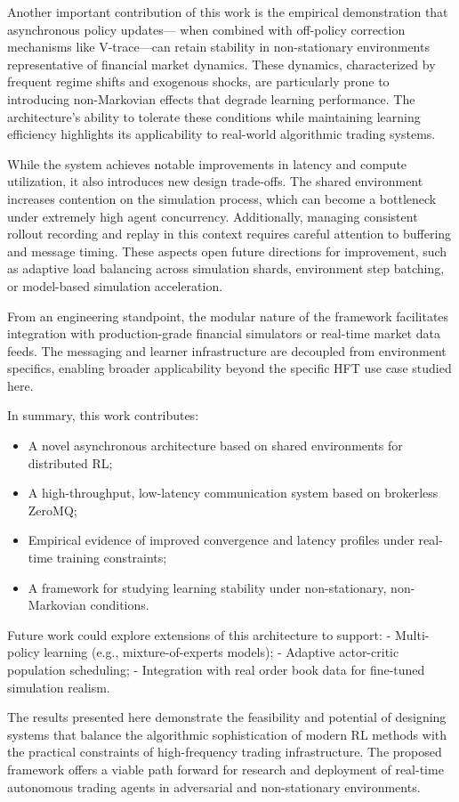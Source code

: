 Another important contribution of this work is the empirical demonstration that asynchronous policy updates---
when combined with off-policy correction mechanisms like V-trace---can retain stability in non-stationary environments representative of financial market dynamics.
These dynamics, characterized by frequent regime shifts and exogenous shocks, are particularly prone to introducing non-Markovian effects that degrade learning performance.
The architecture’s ability to tolerate these conditions while maintaining learning efficiency highlights its applicability to real-world algorithmic trading systems.


While the system achieves notable improvements in latency and compute utilization, it also introduces new design trade-offs.
The shared environment increases contention on the simulation process, which can become a bottleneck under extremely high agent concurrency.
Additionally, managing consistent rollout recording and replay in this context requires careful attention to buffering and message timing.
These aspects open future directions for improvement, such as adaptive load balancing across simulation shards, environment step batching,
or model-based simulation acceleration.

From an engineering standpoint, the modular nature of the framework facilitates integration with production-grade financial simulators or real-time market data feeds.
The messaging and learner infrastructure are decoupled from environment specifics, enabling broader applicability beyond the specific HFT use case studied here.

In summary, this work contributes:
\begin{itemize}
    \item A novel asynchronous architecture based on shared environments for distributed RL;
    \item A high-throughput, low-latency communication system based on brokerless ZeroMQ;
    \item Empirical evidence of improved convergence and latency profiles under real-time training constraints;
    \item A framework for studying learning stability under non-stationary, non-Markovian conditions.
\end{itemize}

Future work could explore extensions of this architecture to support:
- Multi-policy learning (e.g., mixture-of-experts models);
- Adaptive actor-critic population scheduling;
- Integration with real order book data for fine-tuned simulation realism.

The results presented here demonstrate the feasibility and potential of designing systems that balance the algorithmic sophistication of
modern RL methods with the practical constraints of high-frequency trading infrastructure.
The proposed framework offers a viable path forward for research and deployment of real-time autonomous trading agents in adversarial and non-stationary environments.
